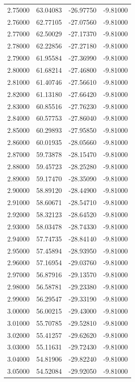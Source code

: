 \begin{table}
\begin{tabular}{llll}
2.75000 & 63.04083 & -26.97750 & -9.81000 \\
2.76000 & 62.77105 & -27.07560 & -9.81000 \\
2.77000 & 62.50029 & -27.17370 & -9.81000 \\
2.78000 & 62.22856 & -27.27180 & -9.81000 \\
2.79000 & 61.95584 & -27.36990 & -9.81000 \\
2.80000 & 61.68214 & -27.46800 & -9.81000 \\
2.81000 & 61.40746 & -27.56610 & -9.81000 \\
2.82000 & 61.13180 & -27.66420 & -9.81000 \\
2.83000 & 60.85516 & -27.76230 & -9.81000 \\
2.84000 & 60.57753 & -27.86040 & -9.81000 \\
2.85000 & 60.29893 & -27.95850 & -9.81000 \\
2.86000 & 60.01935 & -28.05660 & -9.81000 \\
2.87000 & 59.73878 & -28.15470 & -9.81000 \\
2.88000 & 59.45723 & -28.25280 & -9.81000 \\
2.89000 & 59.17470 & -28.35090 & -9.81000 \\
2.90000 & 58.89120 & -28.44900 & -9.81000 \\
2.91000 & 58.60671 & -28.54710 & -9.81000 \\
2.92000 & 58.32123 & -28.64520 & -9.81000 \\
2.93000 & 58.03478 & -28.74330 & -9.81000 \\
2.94000 & 57.74735 & -28.84140 & -9.81000 \\
2.95000 & 57.45894 & -28.93950 & -9.81000 \\
2.96000 & 57.16954 & -29.03760 & -9.81000 \\
2.97000 & 56.87916 & -29.13570 & -9.81000 \\
2.98000 & 56.58781 & -29.23380 & -9.81000 \\
2.99000 & 56.29547 & -29.33190 & -9.81000 \\
3.00000 & 56.00215 & -29.43000 & -9.81000 \\
3.01000 & 55.70785 & -29.52810 & -9.81000 \\
3.02000 & 55.41257 & -29.62620 & -9.81000 \\
3.03000 & 55.11631 & -29.72430 & -9.81000 \\
3.04000 & 54.81906 & -29.82240 & -9.81000 \\
3.05000 & 54.52084 & -29.92050 & -9.81000 \\

\end{tabular}
\end{table}
